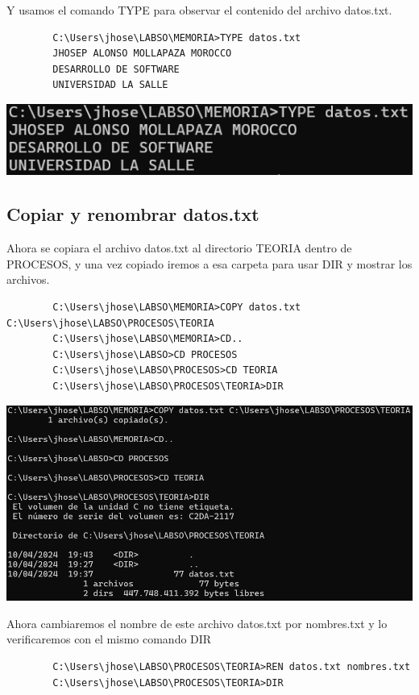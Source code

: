 \documentclass{article}
\begin{document}
        Y usamos el comando TYPE para observar el contenido del archivo datos.txt.
        \begin{verbatim}
        C:\Users\jhose\LABSO\MEMORIA>TYPE datos.txt
        JHOSEP ALONSO MOLLAPAZA MOROCCO
        DESARROLLO DE SOFTWARE
        UNIVERSIDAD LA SALLE
        \end{verbatim}
        
    \includegraphics[scale=1]{WindowsCapturas/TypeDatos.png}

    \subsection{Copiar y renombrar datos.txt}
        Ahora se copiara el archivo datos.txt al directorio TEORIA dentro de PROCESOS, y una vez copiado iremos a esa carpeta para usar DIR y mostrar los archivos.
        \begin{verbatim}
        C:\Users\jhose\LABSO\MEMORIA>COPY datos.txt C:\Users\jhose\LABSO\PROCESOS\TEORIA
        C:\Users\jhose\LABSO\MEMORIA>CD..
        C:\Users\jhose\LABSO>CD PROCESOS
        C:\Users\jhose\LABSO\PROCESOS>CD TEORIA
        C:\Users\jhose\LABSO\PROCESOS\TEORIA>DIR
        \end{verbatim}
        
        \includegraphics[scale=0.6]{WindowsCapturas/CopiarTXT.png}  

        Ahora cambiaremos el nombre de este archivo datos.txt por nombres.txt y lo verificaremos con el mismo comando DIR
        \begin{verbatim}
        C:\Users\jhose\LABSO\PROCESOS\TEORIA>REN datos.txt nombres.txt
        C:\Users\jhose\LABSO\PROCESOS\TEORIA>DIR
        \end{verbatim}
\end{document}
